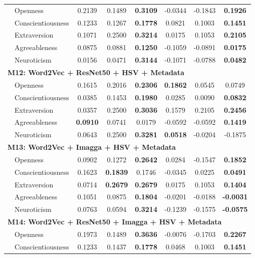 \begin{longtable}{llcccccc}
& Openness & 0.2139 & 0.1489 & \textbf{0.3109} & -0.0344 & -0.1843 & \textbf{0.1926} \\
& Conscientiousness & 0.1233 & 0.1267 & \textbf{0.1778} & 0.0821 & 0.1003 & \textbf{0.1451} \\
& Extraversion & 0.1071 & 0.2500 & \textbf{0.3214} & 0.0175 & 0.1053 & \textbf{0.2105} \\
& Agreeableness & 0.0875 & 0.0881 & \textbf{0.1250} & -0.1059 & -0.0891 & \textbf{0.0175} \\
& Neuroticism & 0.0156 & 0.0471 & \textbf{0.3144} & -0.1071 & -0.0788 & \textbf{0.0482} \\
\hline
\multicolumn{8}{l}{\textbf{M12: Word2Vec + ResNet50 + HSV + Metadata}} \\
& Openness & 0.1615 & 0.2016 & \textbf{0.2306} & \textbf{0.1862} & 0.0545 & 0.0749 \\
& Conscientiousness & 0.0385 & 0.1453 & \textbf{0.1980} & 0.0285 & 0.0090 & \textbf{0.0832} \\
& Extraversion & 0.0357 & 0.2500 & \textbf{0.3036} & 0.1579 & 0.2105 & \textbf{0.2456} \\
& Agreeableness & \textbf{0.0910} & 0.0741 & 0.0179 & -0.0592 & -0.0592 & \textbf{0.1419} \\
& Neuroticism & 0.0643 & 0.2500 & \textbf{0.3281} & \textbf{0.0518} & -0.0204 & -0.1875 \\
\hline
\multicolumn{8}{l}{\textbf{M13: Word2Vec + Imagga + HSV + Metadata}} \\
& Openness & 0.0902 & 0.1272 & \textbf{0.2642} & 0.0284 & -0.1547 & \textbf{0.1852} \\
& Conscientiousness & 0.1623 & \textbf{0.1839} & 0.1746 & -0.0345 & 0.0225 & \textbf{0.0491} \\
& Extraversion & 0.0714 & \textbf{0.2679} & \textbf{0.2679} & 0.0175 & 0.1053 & \textbf{0.1404} \\
& Agreeableness & 0.1051 & 0.0875 & \textbf{0.1804} & -0.0201 & -0.0188 & \textbf{-0.0031} \\
& Neuroticism & 0.0763 & 0.0594 & \textbf{0.3214} & -0.1239 & -0.1575 & \textbf{-0.0575} \\
\hline
\multicolumn{8}{l}{\textbf{M14: Word2Vec + ResNet50 + Imagga + HSV + Metadata}} \\
& Openness & 0.1973 & 0.1489 & \textbf{0.3636} & -0.0076 & -0.1703 & \textbf{0.2267} \\
& Conscientiousness & 0.1233 & 0.1437 & \textbf{0.1778} & 0.0468 & 0.1003 & \textbf{0.1451} \\

\end{longtable}
